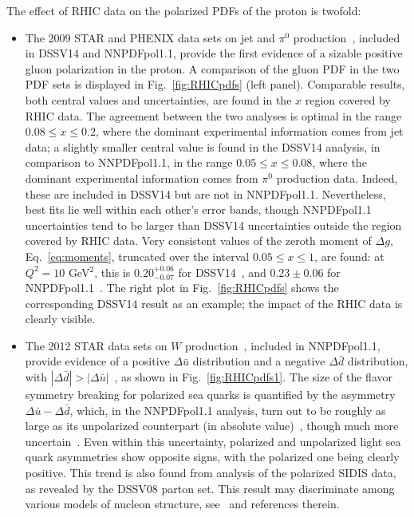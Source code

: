 The effect of RHIC data on the polarized PDFs of the proton is twofold:
\begin{itemize}

\item The 2009 STAR and PHENIX data sets on jet and $\pi^0$ 
production~\cite{Adamczyk:2014ozi,Adare:2014hsq}, included in DSSV14
and NNPDFpol1.1, provide the first evidence
of a sizable positive gluon polarization in the proton. 
%
A comparison of the gluon PDF in the two PDF sets is displayed in 
Fig.~\ref{fig:RHICpdfs} (left panel). 
%
Comparable results, both central values and uncertainties, are found in the 
$x$ region covered by RHIC data. 
%
The agreement between the two analyses is optimal in the
range $0.08\leq x \leq 0.2$, where the dominant experimental information comes
from jet data; a slightly smaller central value is found in the DSSV14 
analysis, in comparison to NNPDFpol1.1, in the range 
$0.05\leq x \leq 0.08$, where the dominant experimental information comes from 
$\pi^0$ production data. 
%
Indeed, these are included in DSSV14 but are not in NNPDFpol1.1. 
%
Nevertheless, best fits lie well within each other's error
bands, though NNPDFpol1.1 uncertainties tend to be larger than DSSV14
uncertainties outside the region covered by RHIC data.
%
Very consistent values of the zeroth moment of $\Delta g$, 
Eq.~\eqref{eq:moments}, truncated over the interval $0.05\leq x \leq 1$, are 
found: at $Q^2=10$ GeV$^2$, this is $0.20^{+0.06}_{-0.07}$ for 
DSSV14~\cite{deFlorian:2014yva}, and $0.23\pm 0.06$ for 
NNPDFpol1.1~\cite{Nocera:2014gqa}. The right plot in Fig.~\ref{fig:RHICpdfs} 
shows the corresponding DSSV14 result as an example; the impact of the RHIC
data is clearly visible. 

\item The 2012 STAR data sets on $W$ production~\cite{Adamczyk:2014xyw}, 
included in NNPDFpol1.1, provide evidence of a positive 
$\Delta\bar{u}$ distribution 
and a negative $\Delta\bar{d}$ distribution, with 
$|\Delta\bar{d}|>|\Delta\bar{u}|$~\cite{Nocera:2014gqa},
as shown in Fig.~\ref{fig:RHICpdfs1}.
% 
The size of the flavor symmetry breaking for polarized sea quarks is 
quantified by the asymmetry $\Delta\bar{u}-\Delta\bar{d}$, which,
in the NNPDFpol1.1 analysis, turn out to be roughly as large as its 
unpolarized counterpart (in absolute value)~\cite{Ball:2017nwa}, 
though much more uncertain~\cite{Nocera:2014rea}. 
%
Even within this uncertainty, polarized and unpolarized light sea quark 
asymmetries show opposite signs, with the polarized one being clearly positive. 
% 
This trend is also found from analysis of the polarized SIDIS data, 
as revealed by the DSSV08 parton set. 
%
This result may discriminate among various models of nucleon structure, 
see~\cite{Nocera:2014rea} and references therein. 

\end{itemize}

